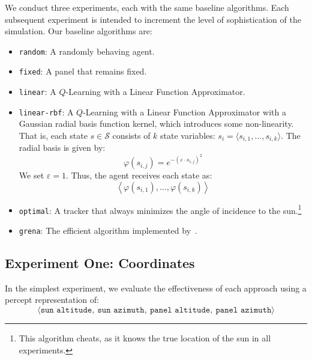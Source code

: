 \documentclass[11pt]{article}
\newcommand{\mc}{\mathcal}
\begin{document}
We conduct three experiments, each with the same baseline algorithms. Each subsequent experiment is intended to increment the level of sophistication of the simulation. Our baseline algorithms are:
\begin{itemize}
\item \texttt{random}: A randomly behaving agent.
\item \texttt{fixed}: A panel that remains fixed.
\item \texttt{linear}: A $Q$-Learning with a Linear Function Approximator.
\item \texttt{linear-rbf}: A $Q$-Learning with a Linear Function Approximator with a Gaussian radial basis function kernel, which introduces some non-linearity. That is, each state $s \in \mc{S}$ consists of $k$ state variables: $s_i = \langle s_{i,1}, \ldots, s_{i,k}\rangle$. The radial basis is given by:
\begin{equation}
\varphi(s_{i,j}) = e^{- \left(\varepsilon \cdot s_{i,j}\right)^2}
\end{equation}
We set $\varepsilon = 1$. Thus, the agent receives each state as:
\begin{equation}
\left\langle \varphi(s_{i,1}), \ldots,  \varphi(s_{i,k})\right\rangle
\end{equation}
\item \texttt{optimal}: A tracker that always minimizes the angle of incidence to the sun.\footnote{This algorithm cheats, as it knows the true location of the sun in all experiments.}
\item \texttt{grena}: The efficient algorithm implemented by~\citet{Grena2008}.
\end{itemize}

\subsection{Experiment One: Coordinates}

In the simplest experiment, we evaluate the effectiveness of each approach using a percept representation of:
\begin{equation}
\langle \texttt{sun altitude},\ \texttt{sun azimuth},\ \texttt{panel altitude},\ \texttt{panel azimuth} \rangle
\end{equation}
\end{document}
